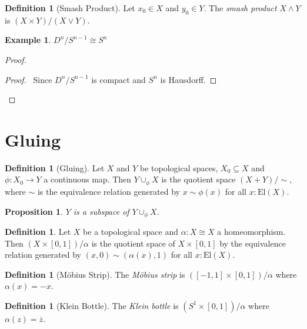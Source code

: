 \documentclass{book}
\let\qed\relax
\newtheorem{prop}[ax]{Proposition}
\theoremstyle{definition}
\newtheorem{df}[ax]{Definition}
\newtheorem{ex}[ax]{Example}
\newcommand{\El}[1]{\ensuremath{\mathrm{El} \left( {#1} \right)}}
\begin{document}
\begin{df}[Smash Product]
Let $x_0 \in X$ and $y_0 \in Y$. The \emph{smash product} $X \wedge Y$ is $(X \times Y) / (X \vee Y)$.
\end{df}

\begin{ex}
$D^n / S^{n-1} \cong S^n$
\end{ex}

\begin{proof}
\pf
{}
\begin{proof}
	\pf\ Since $D^n / S^{n-1}$ is compact and $S^n$ is Hausdorff.
\end{proof}
\qed
\end{proof}

\section{Gluing}

\begin{df}[Gluing]
Let $X$ and $Y$ be topological spaces, $X_0 \subseteq X$ and $\phi : X_0 \rightarrow Y$ a continuous map. Then $Y \cup_\phi X$ is the quotient space $(X + Y)/ \sim$, where $\sim$ is the equivalence relation generated by $x \sim \phi(x)$ for all $x : \El{X}$.
\end{df}

\begin{prop}
$Y$ is a subspace of $Y \cup_\phi X$.
\end{prop}

\begin{df}
Let $X$ be a topological space and $\alpha : X \cong X$ a homeomorphism. Then $(X \times [0,1]) / \alpha$ is the quotient space of $X \times [0,1]$ by the equivalence relation generated by $(x,0) \sim (\alpha(x),1)$ for all $x : \El{X}$.
\end{df}

\begin{df}[M\"{o}bius Strip]
The \emph{M\"{o}bius strip} is $([-1,1] \times [0,1])/ \alpha$ where $\alpha(x) = -x$.
\end{df}

\begin{df}[Klein Bottle]
The \emph{Klein bottle} is $(S^1 \times [0,1]) / \alpha$ where $\alpha(z) = \overline{z}$.
\end{df}
\end{document}
